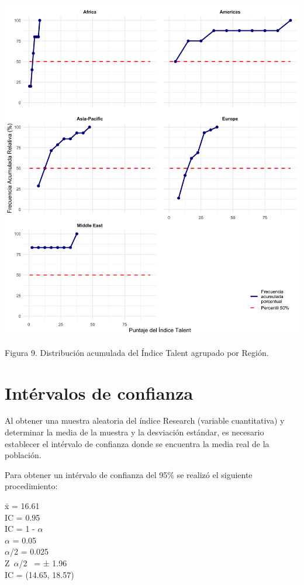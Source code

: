 \documentclass[
]{article}
\begin{document}
\begin{multicols}{2}
\begin{center}
\includegraphics[width=\linewidth]{figura9.png}
\end{center}
Figura 9. Distribución acumulada del Índice Talent agrupado por Región.

\section{Intérvalos de confianza}

Al obtener una muestra aleatoria del índice Research (variable cuantitativa) y determinar la media de la muestra y la desviación estándar, es necesario establecer el intérvalo de confianza donde se encuentra la media real de la población.

Para obtener un intérvalo de confianza del 95\% se realizó el siguiente procedimiento:

x̄ = 16.61\\
IC = 0.95\\
IC = 1 - $\alpha$\\
$\alpha$ = 0.05\\
$\alpha$/2 = 0.025\\
Z~$\alpha$/2~ = ± 1.96\\
IC = (14.65,  18.57)\\


\end{multicols}
\end{document}
